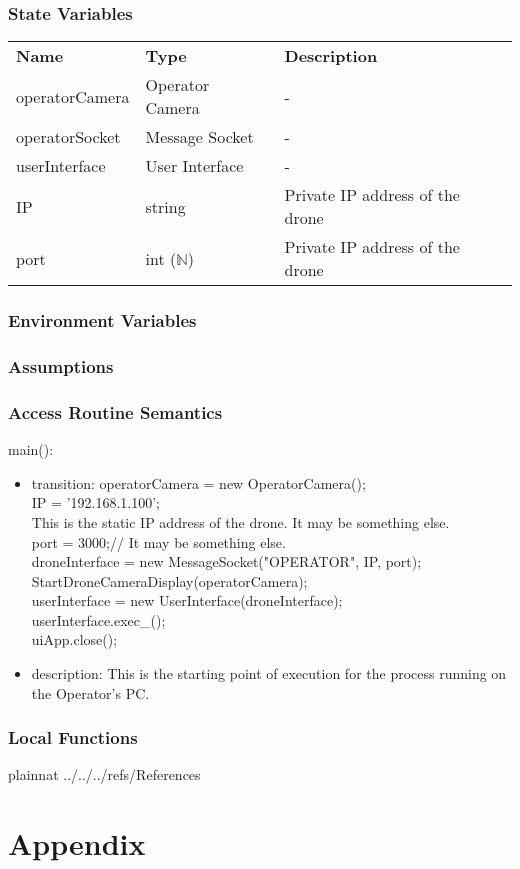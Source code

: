 \documentclass[12pt, titlepage]{article}
\begin{document}
\subsubsection{State Variables}
\begin{center}
\begin{tabular}{p{3 cm} p{4cm} p{5cm} }
\hline
\textbf{Name} & \textbf{Type} & \textbf{Description}  \\
operatorCamera & Operator Camera & - \\
operatorSocket & Message Socket & - \\
userInterface & User Interface & - \\
IP & string & Private IP address of the drone \\
port & int ($\mathbb{N}$) & Private IP address of the drone \\
\hline
\hline
\end{tabular}
\end{center}
\subsubsection{Environment Variables}
\subsubsection{Assumptions}
\subsubsection{Access Routine Semantics}
\noindent main():
\begin{itemize}
\item transition: operatorCamera = new OperatorCamera(); \\
IP = '192.168.1.100'; \\This is the static IP address of the drone. It may be something else. \\
port = 3000;// It may be something else. \\
droneInterface = new MessageSocket("OPERATOR", IP, port); \\
StartDroneCameraDisplay(operatorCamera); \\
userInterface = new UserInterface(droneInterface);\\
userInterface.exec\_(); \\
uiApp.close();
\item description: This is the starting point of execution for the process running on the Operator's PC.
\end{itemize}
\subsubsection{Local Functions}
\newpage






 {plainnat}
 {../../../refs/References}

\newpage

\section{Appendix} \label{Appendix}

\end{document}
